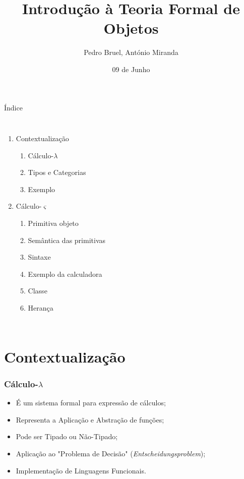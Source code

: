 \documentclass[10pt, compress]{beamer}
\title{Introdução à Teoria Formal de Objetos}
\subtitle{}
\date{09 de Junho}
\author{Pedro Bruel, António Miranda}
\institute{Programação Orientada a Objetos 2015}
\begin{document}
\maketitle

\begin{frame}{Índice}
  \begin{columns}[onlytextwidth]
      \begin{enumerate}
        \item Contextualização
            \begin{enumerate}
                \item Cálculo-$\lambda$
                \item Tipos e Categorias
                \item Exemplo
            \end{enumerate}
        \item Cálculo-$\varsigma$
            \begin{enumerate}
                \item Primitiva objeto
                \item Semântica das primitivas
                \item Sintaxe
                \item Exemplo da calculadora
                \item Classe
                \item Herança
            \end{enumerate}
      \end{enumerate}
  \end{columns}
\end{frame}

\section{Contextualização}

\begin{frame}[fragile]
  \frametitle{Cálculo-$\lambda$}
    \begin{itemize}
        \item É um sistema formal para expressão de cálculos;
        \item Representa a Aplicação e Abstração de funções;
        \item Pode ser Tipado ou Não-Tipado;
        \pause
        \item Aplicação ao "Problema de Decisão" (\emph{Entscheidungsproblem});
        \item Implementação de Linguagens Funcionais.
  \end{itemize}
\end{frame}
\end{document}
